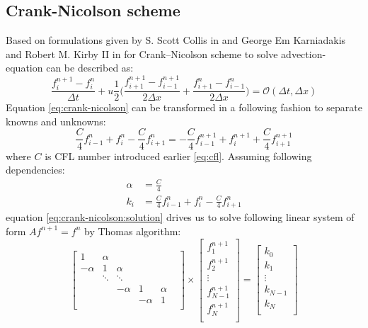 \subsection{Crank-Nicolson scheme} \label{s:general-approach:crank-nicolson-analysis}
	Based on formulations given by S. Scott Collis in \cite{bib:introduction} and George Em Karniadakis and Robert M. Kirby II in \cite{bib:mpi} for Crank--Nicolson scheme to solve \gls{advection-equation} can be described as:
	\begin{equation} \label{eq:crank-nicolson}
		\frac{f_i^{n+1} - f_i^n}{\Delta t} +  u \frac{1}{2} \bigg(\frac{f_{i+1}^{n+1} - f_{i-1}^{n+1}}{2\Delta x} + \frac{f_{i+1}^{n} - f_{i-1}^n}{2\Delta x}\bigg)= \mathcal{O}(\Delta t, \Delta x)
	\end{equation}
	Equation \eqref{eq:crank-nicolson} can be transformed in a following fashion to separate knowns and unknowns:
	\begin{equation} \label{eq:crank-nicolson:solution}
		\frac{C}{4} f_{i-1}^n + f_{i}^n - \frac{C}{4} f_{i+1}^n = -\frac{C}{4} f_{i-1}^{n+1} + f_{i}^{n+1} + \frac{C}{4} f_{i+1}^{n+1}
	\end{equation}
	where $C$ is \gls{CFL} number introduced earlier \eqref{eq:cfl}. Assuming following dependencies:
	\begin{equation}
		\begin{split}
			\alpha &= \frac{C}{4}\\
			 k_i &= \frac{C}{4} f_{i-1}^n + f_{i}^n - \frac{C}{4} f_{i+1}^n
		\end{split}
	\end{equation}
	equation \ref{eq:crank-nicolson:solution} drives us to solve following linear system of form $Af^{n+1} = f^n$ by Thomas algorithm:		
	\begin{equation}
		\begin{bmatrix}
			1 		& \alpha &		  &  	 &		&\\
			-\alpha & 1 	 & \alpha &  	 &		&\\ 
					& \ddots & \ddots &  	 &		&\\
					&		 &-\alpha & 1 	 &\alpha&\\
					& 		 & 		  &-\alpha&	1	&\\					
		\end{bmatrix} 
		\times
		\begin{bmatrix}
			f_1^{n+1} \\
			f_2^{n+1} \\
			\vdots	\\
			f_{N-1}^{n+1}\\
			f_{N}^{n+1}\\
		\end{bmatrix}
		=
		\begin{bmatrix}
			k_0 \\
			k_1 \\
			\vdots	\\
			k_{N-1} \\
			k_{N} \\
		\end{bmatrix}
	\end{equation}		
